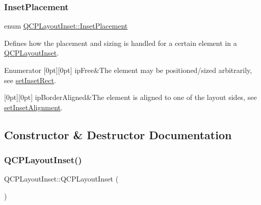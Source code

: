 \subsubsection{\texorpdfstring{InsetPlacement}{InsetPlacement}}
{\footnotesize\ttfamily enum \mbox{\hyperlink{class_q_c_p_layout_inset_a8b9e17d9a2768293d2a7d72f5e298192}{Q\+C\+P\+Layout\+Inset\+::\+Inset\+Placement}}}

Defines how the placement and sizing is handled for a certain element in a \mbox{\hyperlink{class_q_c_p_layout_inset}{Q\+C\+P\+Layout\+Inset}}. \begin{DoxyEnumFields}{Enumerator}
[0pt][0pt]{}\mbox{\label{class_q_c_p_layout_inset_a8b9e17d9a2768293d2a7d72f5e298192aa4802986ea2cea457f932b115acba59e}} 
ip\+Free&The element may be positioned/sized arbitrarily, see \mbox{\hyperlink{class_q_c_p_layout_inset_aa487c8378a6f9533567a2e6430099dc3}{set\+Inset\+Rect}}. \\
\hline

[0pt][0pt]{}\mbox{\label{class_q_c_p_layout_inset_a8b9e17d9a2768293d2a7d72f5e298192aa81e7df4a785ddee2229a8f47c46e817}} 
ip\+Border\+Aligned&The element is aligned to one of the layout sides, see \mbox{\hyperlink{class_q_c_p_layout_inset_a62882a4f9ad58bb0f53da12fde022abe}{set\+Inset\+Alignment}}. \\
\hline

\end{DoxyEnumFields}


\subsection{Constructor \& Destructor Documentation}
\mbox{\label{class_q_c_p_layout_inset_a3ad984f3221735374cc5dee14356a7dd}} 
\subsubsection{\texorpdfstring{QCPLayoutInset()}{QCPLayoutInset()}}
{\footnotesize\ttfamily Q\+C\+P\+Layout\+Inset\+::\+Q\+C\+P\+Layout\+Inset (\begin{DoxyParamCaption}{ }\end{DoxyParamCaption})\hspace{0.3cm}{\ttfamily [explicit]}}

